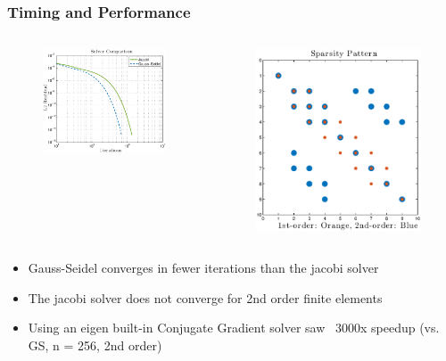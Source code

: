 \documentclass[unknownkeysallowed,12pt,mathserif]{beamer}
\begin{document}
\begin{frame}

\frametitle{Timing and Performance}

\begin{columns}[c]
\begin{column}{6.5cm}
\begin{figure}[!htbp] 
\includegraphics[width=5cm]{solver_convergence.eps}
\end{figure}
\end{column}
\begin{column}{6.5cm}
\begin{figure}[!htbp] 
\includegraphics[width=6.5cm]{sparsity.eps}
\end{figure}
\end{column}
\end{columns}
\begin{itemize}
\item \small Gauss-Seidel converges in fewer iterations than the jacobi solver
\item \small The jacobi solver does not converge for 2nd order finite elements
\item \small Using an eigen built-in Conjugate Gradient solver saw ~3000x speedup (vs. GS, n = 256, 2nd order)
\end{itemize}

\end{frame}
\end{document}
